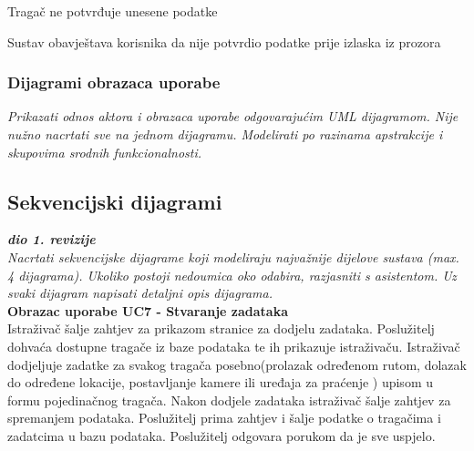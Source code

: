 \begin{packed_item}
\begin{packed_item}
\begin{packed_enum}
						\end{packed_enum}
						
						\item[3.a] Tragač ne potvrđuje unesene podatke
						\item[] \begin{packed_enum}
							
							\item Sustav obavještava korisnika da nije potvrdio podatke prije izlaska iz prozora
							
						\end{packed_enum}
						
					\end{packed_item}
					
				\end{packed_item}
					
					
					
				\subsubsection{Dijagrami obrazaca uporabe}
					
					\textit{Prikazati odnos aktora i obrazaca uporabe odgovarajućim UML dijagramom. Nije nužno nacrtati sve na jednom dijagramu. Modelirati po razinama apstrakcije i skupovima srodnih funkcionalnosti.}
				\eject		
				
			\subsection{Sekvencijski dijagrami}
				
				\textbf{\textit{dio 1. revizije}}\\
				
				\textit{Nacrtati sekvencijske dijagrame koji modeliraju najvažnije dijelove sustava (max. 4 dijagrama). Ukoliko postoji nedoumica oko odabira, razjasniti s asistentom. Uz svaki dijagram napisati detaljni opis dijagrama.}\\
				
				\noindent \textbf{Obrazac uporabe UC7 - Stvaranje zadataka}\\
				
				\noindent Istraživač šalje zahtjev za prikazom stranice za dodjelu zadataka. Poslužitelj dohvaća dostupne tragače iz baze podataka te ih prikazuje istraživaču. Istraživač dodjeljuje zadatke za svakog tragača posebno(prolazak određenom rutom, dolazak do određene lokacije, postavljanje kamere ili uređaja za praćenje
				) upisom u formu pojedinačnog tragača. Nakon dodjele zadataka istraživač šalje zahtjev za spremanjem podataka. Poslužitelj prima zahtjev i šalje podatke o tragačima i zadatcima u bazu podataka. Poslužitelj odgovara porukom da je sve uspjelo.
				
